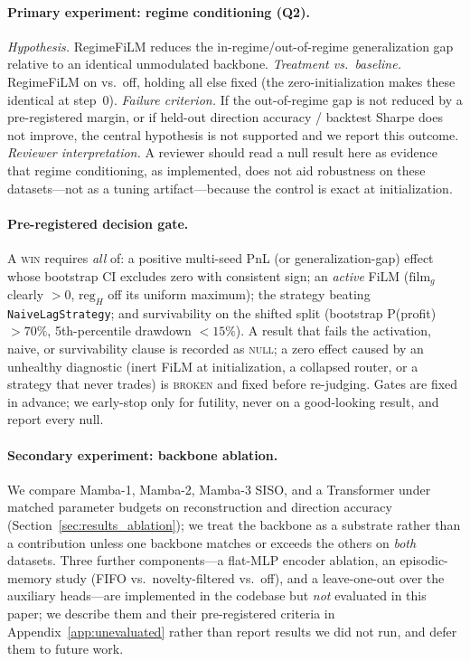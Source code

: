 \documentclass{article}
\begin{document}
\paragraph{Primary experiment: regime conditioning (Q2).}
\emph{Hypothesis.} RegimeFiLM reduces the in-regime/out-of-regime
generalization gap relative to an identical unmodulated backbone.
\emph{Treatment vs.\ baseline.} RegimeFiLM on vs.\ off, holding all else
fixed (the zero-initialization makes these identical at step~0).
\emph{Failure criterion.} If the out-of-regime gap is not reduced by a
pre-registered margin, or if held-out direction accuracy / backtest
Sharpe does not improve, the central hypothesis is not supported and we
report this outcome.
\emph{Reviewer interpretation.} A reviewer should read a null result
here as evidence that regime conditioning, as implemented, does not aid
robustness on these datasets---not as a tuning artifact---because the
control is exact at initialization.

\paragraph{Pre-registered decision gate.}
A \textsc{win} requires \emph{all} of: a positive multi-seed PnL (or
generalization-gap) effect whose bootstrap CI excludes zero with
consistent sign; an \emph{active} FiLM ($\mathrm{film}_g$ clearly $> 0$,
$\mathrm{reg}_H$ off its uniform maximum); the strategy beating
\texttt{NaiveLagStrategy}; and survivability on the shifted split
(bootstrap P(profit) $> 70\%$, 5th-percentile drawdown $< 15\%$).  A
result that fails the activation, naive, or survivability clause is
recorded as \textsc{null}; a zero effect caused by an unhealthy
diagnostic (inert FiLM at initialization, a collapsed router, or a
strategy that never trades) is \textsc{broken} and fixed before
re-judging.  Gates are fixed in advance; we early-stop only for futility,
never on a good-looking result, and report every null.

\paragraph{Secondary experiment: backbone ablation.}
We compare Mamba-1, Mamba-2, Mamba-3 SISO, and a Transformer under matched
parameter budgets on reconstruction and direction accuracy
(Section~\ref{sec:results_ablation}); we treat the backbone as a substrate
rather than a contribution unless one backbone matches or exceeds the others
on \emph{both} datasets.  Three further
components---a flat-MLP encoder ablation, an episodic-memory study (FIFO
vs.\ novelty-filtered vs.\ off), and a leave-one-out over the auxiliary
heads---are implemented in the codebase but \emph{not} evaluated in this
paper; we describe them and their pre-registered criteria in
Appendix~\ref{app:unevaluated} rather than report results we did not run, and
defer them to future work.
\end{document}
